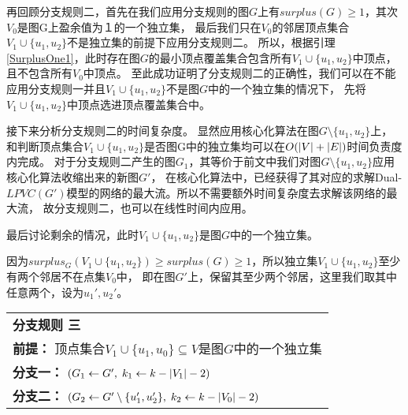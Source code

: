 再回顾分支规则二，首先在我们应用分支规则的图$G$上有$surplus(G) \ge 1$，其次$V_0$是图G上盈余值为１的一个独立集，
最后我们只在$V_0$的邻居顶点集合$V_1 \cup \{u_1, u_2\}$不是独立集的前提下应用分支规则二。
所以，根据引理\ref{SurplusOne1}，此时存在图$G$的最小顶点覆盖集合包含所有$V_1 \cup \{u_1, u_2\}$中顶点，且不包含所有$V_0$中顶点。
至此成功证明了分支规则二的正确性，我们可以在不能应用分支规则一并且$V_1 \cup \{u_1, u_2\}$不是图$G$中的一个独立集的情况下，
先将$V_1 \cup \{u_1, u_2\}$中顶点选进顶点覆盖集合中。

接下来分析分支规则二的时间复杂度。
显然应用核心化算法在图$G \setminus \{u_1, u_2\}$上，
和判断顶点集合$V_1 \cup \{u_1, u_2\}$是否图G中的独立集均可以在$O(\left\vert V \right\vert + \left\vert E \right\vert)$时间负责度内完成。
对于分支规则二产生的图$G_1$，其等价于前文中我们对图$G \setminus \{u_1, u_2\}$应用核心化算法收缩出来的新图$G'$，
在核心化算法中，已经获得了其对应的求解Dual-$LPVC(G')$模型的网络的最大流。所以不需要额外时间复杂度去求解该网络的最大流，
故分支规则二，也可以在线性时间内应用。

最后讨论剩余的情况，此时$V_1 \cup \{u_1, u_2\}$是图$G$中的一个独立集。

因为$surplus_G(V_1 \cup \{u_1, u_2\}) \ge surplus(G) \ge 1$，所以独立集$V_1 \cup \{u_1, u_2\}$至少有两个邻居不在点集$V_0$中，
即在图$G'$上，保留其至少两个邻居，这里我们取其中任意两个，设为$u_1', u_2'$。\\

\begin{tabular}{ p{0.9\headwidth} }
  \hline
  \textbf{分支规则 三 }\\
  \textbf{前提：} 顶点集合$V_1 \cup \{u_1, u_0\}\subseteq V$是图$G$中的一个独立集 \\
  \textbf{分支一：} $(G_1 \leftarrow G',\; k_1 \leftarrow k - \left\vert V_1 \right\vert - 2)$\\
  \textbf{分支二：} $(G_2 \leftarrow G' \setminus \{u_1', u_2'\},\; k_2 \leftarrow k - \left\vert V_0 \right\vert - 2)$\\
  \hline
\end{tabular} \vspace{0.5cm}

